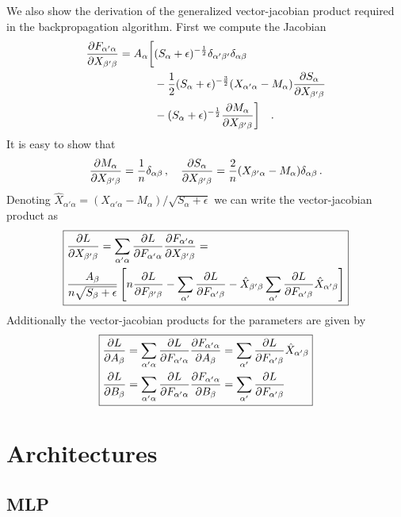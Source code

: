 \documentclass{myclass}
\begin{document}
We also show the derivation of the generalized vector-jacobian product required in the
backpropagation algorithm. First we compute the Jacobian
\[
\begin{split}
   \pdv{F_{\alpha'\alpha}}{X_{\beta'\beta}} = A_\alpha \bigg[ 
                                            & (S_\alpha + \epsilon)^{-\frac{1}{2}} \delta_{\alpha'\beta'} \delta_{\alpha\beta} \\
                                            & - \frac{1}{2}(S_\alpha + \epsilon)^{-\frac{3}{2}} (X_{\alpha'\alpha} - M_\alpha) \pdv{S_\alpha}{X_{\beta'\beta}} \\
                                            & - (S_\alpha + \epsilon)^{-\frac{1}{2}} \pdv{M_\alpha}{X_{\beta'\beta}}
                                            \bigg]\quad.
\end{split}
\]
It is easy to show that 
\[
   \pdv{M_\alpha}{X_{\beta'\beta}} = \frac{1}{n} \delta_{\alpha\beta}\,,\quad \pdv{S_\alpha}{X_{\beta'\beta}} = \frac{2}{n}(X_{\beta'\alpha} - M_\alpha) \delta_{\alpha\beta} \,.
\]
Denoting \(\hat{X}_{\alpha'\alpha} = (X_{\alpha'\alpha} - M_\alpha) / \sqrt{S_\alpha + \epsilon}\)
we can write the vector-jacobian product as
\[
\boxed
{
\begin{split}
   &\pdv{L}{X_{\beta'\beta}} = \sum_{\alpha'\alpha} \pdv{L}{F_{\alpha'\alpha}} \pdv{F_{\alpha'\alpha}}{X_{\beta'\beta}} =\\
   &\frac{A_\beta}{n\sqrt{S_\beta + \epsilon}} \left[ n \pdv{L}{F_{\beta'\beta}} - \sum_{\alpha'} \pdv{L}{F_{\alpha'\beta}} - \hat{X}_{\beta'\beta} \sum_{\alpha'} \pdv{L}{F_{\alpha'\beta}} \hat{X}_{\alpha'\beta} \right]
\end{split}
}
\]
Additionally the vector-jacobian products for the parameters are given by
\[
\boxed
{
\begin{split}
   &\pdv{L}{A_\beta} = \sum_{\alpha'\alpha} \pdv{L}{F_{\alpha'\alpha}} \pdv{F_{\alpha'\alpha}}{A_\beta} = \sum_{\alpha'} \pdv{L}{F_{\alpha'\beta}} \hat{X}_{\alpha'\beta}\\
   &\pdv{L}{B_\beta} =  \sum_{\alpha'\alpha} \pdv{L}{F_{\alpha'\alpha}} \pdv{F_{\alpha'\alpha}}{B_\beta} = \sum_{\alpha'} \pdv{L}{F_{\alpha'\beta}}
\end{split}
}
\]

\section{Architectures}

\subsection{MLP}
\end{document}
